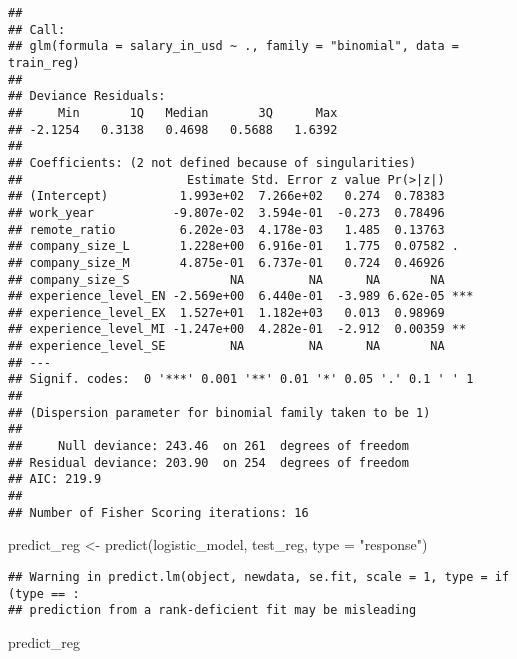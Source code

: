 \documentclass[
]{article}
\newenvironment{Shaded}{\begin{snugshade}}{\end{snugshade}}
\newcommand{\AttributeTok}[1]{\textcolor[rgb]{0.77,0.63,0.00}{#1}}
\newcommand{\FunctionTok}[1]{\textcolor[rgb]{0.00,0.00,0.00}{#1}}
\newcommand{\NormalTok}[1]{#1}
\newcommand{\OtherTok}[1]{\textcolor[rgb]{0.56,0.35,0.01}{#1}}
\newcommand{\StringTok}[1]{\textcolor[rgb]{0.31,0.60,0.02}{#1}}
\begin{document}
\begin{verbatim}
## 
## Call:
## glm(formula = salary_in_usd ~ ., family = "binomial", data = train_reg)
## 
## Deviance Residuals: 
##     Min       1Q   Median       3Q      Max  
## -2.1254   0.3138   0.4698   0.5688   1.6392  
## 
## Coefficients: (2 not defined because of singularities)
##                       Estimate Std. Error z value Pr(>|z|)    
## (Intercept)          1.993e+02  7.266e+02   0.274  0.78383    
## work_year           -9.807e-02  3.594e-01  -0.273  0.78496    
## remote_ratio         6.202e-03  4.178e-03   1.485  0.13763    
## company_size_L       1.228e+00  6.916e-01   1.775  0.07582 .  
## company_size_M       4.875e-01  6.737e-01   0.724  0.46926    
## company_size_S              NA         NA      NA       NA    
## experience_level_EN -2.569e+00  6.440e-01  -3.989 6.62e-05 ***
## experience_level_EX  1.527e+01  1.182e+03   0.013  0.98969    
## experience_level_MI -1.247e+00  4.282e-01  -2.912  0.00359 ** 
## experience_level_SE         NA         NA      NA       NA    
## ---
## Signif. codes:  0 '***' 0.001 '**' 0.01 '*' 0.05 '.' 0.1 ' ' 1
## 
## (Dispersion parameter for binomial family taken to be 1)
## 
##     Null deviance: 243.46  on 261  degrees of freedom
## Residual deviance: 203.90  on 254  degrees of freedom
## AIC: 219.9
## 
## Number of Fisher Scoring iterations: 16
\end{verbatim}

\begin{Shaded}
\begin{Highlighting}[]
\NormalTok{predict\_reg }\OtherTok{\textless{}{-}} \FunctionTok{predict}\NormalTok{(logistic\_model, }
\NormalTok{                       test\_reg, }\AttributeTok{type =} \StringTok{"response"}\NormalTok{)}
\end{Highlighting}
\end{Shaded}

\begin{verbatim}
## Warning in predict.lm(object, newdata, se.fit, scale = 1, type = if (type == :
## prediction from a rank-deficient fit may be misleading
\end{verbatim}

\begin{Shaded}
\begin{Highlighting}[]
\NormalTok{predict\_reg  }
\end{Highlighting}
\end{Shaded}
\end{document}
